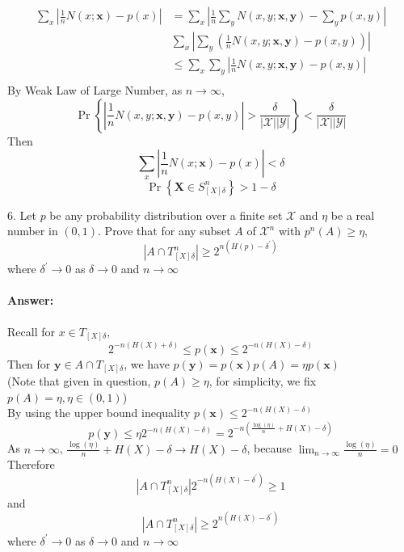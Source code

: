 \documentclass[8pt]{article}
\begin{document}
$$
\begin{aligned}
\sum_{x}\left|\frac{1}{n} N(x ; \mathbf{x})-p(x)\right|
&=\sum_{x}\left|\frac{1}{n} \sum_{y} N(x, y ; \mathbf{x}, \mathbf{y})-\sum_{y} p(x, y)\right| \\
&\sum_{x}\left|\sum_{y}\left(\frac{1}{n} N(x, y ; \mathbf{x}, \mathbf{y})-p(x, y)\right)\right| \\
&\leq \sum_{x} \sum_{y} \left|\frac{1}{n} N(x, y ; \mathbf{x}, \mathbf{y})-p(x, y)\right| \\
\end{aligned}
$$
By Weak Law of Large Number, as $n \rightarrow \infty$,
$$
\operatorname{Pr}\left\{  \left|\frac{1}{n} N(x, y ; \mathbf{x}, \mathbf{y})-p(x, y)\right| >\frac{\delta}{|\mathcal{X}| |\mathcal{Y}|}\right\}<\frac{\delta}{|\mathcal{X}| |\mathcal{Y}|}
$$
Then 
$$
\sum_{x}\left|\frac{1}{n} N(x ; \mathbf{x})-p(x)\right| < \delta
$$
$$
\operatorname{Pr}\left\{\mathbf{X} \in S_{[X] \delta}^{n}\right\}>1-\delta
$$
\vspace{10pt}

6. Let $p$ be any probability distribution over a finite set $\mathcal{X}$ and $\eta$ be a real number in $(0,1) .$ Prove that for any subset $A$ of $\mathcal{X}^{n}$ with $p^{n}(A) \geq \eta$,
$$
\left|A \cap T_{[X] \delta}^{n}\right| \geq 2^{n\left(H(p)-\delta^{\prime}\right)}
$$
where $\delta^{\prime} \rightarrow 0$ as $\delta \rightarrow 0$ and $n \rightarrow \infty$

\paragraph{Answer:}
Recall for $x \in T_{[X] \delta}$,
$$
2^{-n(H(X)+\delta)} \leq p(\mathbf{x}) \leq 2^{-n(H(X)-\delta)}
$$
Then for $\mathbf{y} \in A \cap T_{[X] \delta}$, we have $p(\mathbf{y}) = p(\mathbf{x})p(A) = \eta p(\mathbf{x})$ \\ (Note that given in question, $p(A) \geq \eta$, for simplicity, we fix $p(A) = \eta, \eta \in (0, 1)$)\\
By using the upper bound inequality $p(\mathbf{x}) \leq 2^{-n(H(X)-\delta)}$
$$
p(\mathbf{y}) \leq \eta 2^{-n(H(X)-\delta)} = 2^{-n( \frac{\log(\eta)}{n} + H(X)-\delta)}
$$
As $n \rightarrow \infty$, $\frac{\log(\eta)}{n} +  H(X)-\delta \rightarrow H(X)-\delta$, because $\lim_{n\rightarrow \infty}\frac{\log(\eta)}{n} = 0$
Therefore
$$
\left|A \cap T_{[X] \delta}^{n}\right| 2^{-n(H(X)-\delta^{\prime})} \geq 1
$$
and
$$
\left|A \cap T_{[X] \delta}^{n}\right| \geq 2^{n(H(X)-\delta^{\prime})}
$$
where $\delta^{\prime} \rightarrow 0$ as $\delta \rightarrow 0$ and $n \rightarrow \infty$
\end{document}
